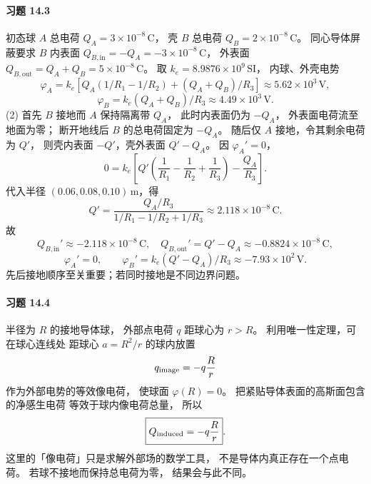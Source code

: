 \paragraph{习题 14.3}
初态球 \(A\) 总电荷 \(Q_A=3\times10^{-8}\,\mathrm C\)，
壳 \(B\) 总电荷 \(Q_B=2\times10^{-8}\,\mathrm C\)。
同心导体屏蔽要求 \(B\) 内表面
\(Q_{B,\mathrm{in}}=-Q_A=-3\times10^{-8}\,\mathrm C\)，
外表面
\(Q_{B,\mathrm{out}}=Q_A+Q_B=5\times10^{-8}\,\mathrm C\)。
取 \(k_e=8.9876\times10^9\,\mathrm{SI}\)，
内球、外壳电势
\[
 \boxed{\varphi_A=k_e
 [Q_A(1/R_1-1/R_2)+(Q_A+Q_B)/R_3]
 \approx5.62\times10^3\,\mathrm V},
\]
\[
 \boxed{\varphi_B=k_e(Q_A+Q_B)/R_3
 \approx4.49\times10^3\,\mathrm V}.
\]
(2) 首先 \(B\) 接地而 \(A\) 保持隔离带 \(Q_A\)，
此时内表面仍为 \(-Q_A\)，
外表面电荷流至地面为零；
断开地线后 \(B\) 的总电荷固定为 \(-Q_A\)。
随后仅 \(A\) 接地，令其剩余电荷为 \(Q'\)，
则壳内表面 \(-Q'\)，壳外表面 \(Q'-Q_A\)。
因 \(\varphi_A'=0\)，
\[
 0=k_e\!\left[
 Q'\left(\frac1{R_1}-\frac1{R_2}+\frac1{R_3}\right)
 -\frac{Q_A}{R_3}\right].
\]
代入半径 \((0.06,0.08,0.10)\,\mathrm m\)，得
\[
 \boxed{Q'=\frac{Q_A/R_3}{1/R_1-1/R_2+1/R_3}
 \approx2.118\times10^{-8}\,\mathrm C}.
\]
故
\[
 \boxed{Q_{B,\mathrm{in}}'\approx-2.118\times10^{-8}\,\mathrm C},
 \quad
 \boxed{Q_{B,\mathrm{out}}'=Q'-Q_A
 \approx-0.8824\times10^{-8}\,\mathrm C},
\]
\[
 \boxed{\varphi_A'=0,\qquad
 \varphi_B'=k_e(Q'-Q_A)/R_3
 \approx-7.93\times10^2\,\mathrm V}.
\]
先后接地顺序至关重要；若同时接地是不同边界问题。

\paragraph{习题 14.4}
半径为 \(R\) 的接地导体球，
外部点电荷 \(q\) 距球心为 \(r>R\)。
利用唯一性定理，可在球心连线处
距球心 \(a=R^2/r\) 的球内放置
\[
 q_{\rm image}=-q\frac Rr
\]
作为外部电势的等效像电荷，
使球面 \(\varphi(R)=0\)。
把紧贴导体表面的高斯面包含的净感生电荷
等效于球内像电荷总量，
所以
\[
 \boxed{Q_{\rm induced}=-q\frac Rr}.
\]
这里的「像电荷」只是求解外部场的数学工具，
不是导体内真正存在一个点电荷。
若球不接地而保持总电荷为零，
结果会与此不同。

